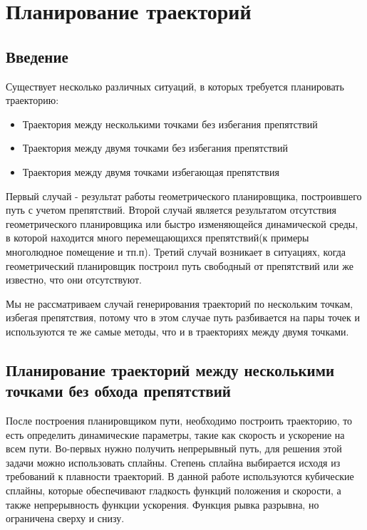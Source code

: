 \chapter{Планирование траекторий} \label{chapt2}

\section{Введение} \label{sect2_1}
Существует несколько различных ситуаций, в которых требуется планировать траекторию:
\begin{itemize}
	\item Траектория между несколькими точками без избегания препятствий
	\item Траектория между двумя точками без избегания препятствий
	\item Траектория между двумя точками избегающая препятствия
\end{itemize}

Первый случай - результат работы геометрического планировщика, построившего путь с учетом препятствий.
Второй случай является результатом отсутствия геометрического планировщика или быстро изменяющейся динамической среды, в которой находится много перемещающихся препятствий(к примеры многолюдное помещение и тп.п). Третий случай возникает в ситуациях, когда геометрический планировщик построил путь свободный от препятствий или же известно, что они отсутствуют.

Мы не рассматриваем случай генерирования траекторий по нескольким точкам, избегая препятствия, потому что в этом случае путь разбивается на пары точек и используются те же самые методы, что и в траекториях между двумя точками.

\section{Планирование траекторий между несколькими точками без обхода препятствий} \label{sect2_2}
После построения планировщиком пути, необходимо построить траекторию, то есть определить динамические параметры, такие как скорость и ускорение на всем пути. Во-первых нужно получить непрерывный путь, для решения этой задачи можно использовать сплайны. Степень сплайна выбирается исходя из требований к плавности траекторий. В данной работе используются кубические сплайны, которые обеспечивают гладкость функций положения и скорости, а также непрерывность функции ускорения. Функция рывка разрывна, но ограничена сверху и снизу.

